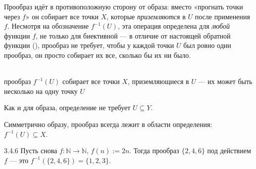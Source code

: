 \begin{intuition}
Прообраз идёт в противоположную сторону от образа: вместо «прогнать точки через $f$» он
собирает все точки $X$, которые \emph{приземляются} в $U$ после применения $f$. Несмотря на
обозначение $f^{-1}(U)$, эта операция определена для \emph{любой} функции $f$, не только для
биективной — в отличие от настоящей обратной функции
(), прообраз не требует, чтобы у каждой точки $U$ был
ровно один прообраз, он просто собирает их все, сколько бы их ни было.

\begin{center}
\\
{\footnotesize\color{intuitiongray}прообраз $f^{-1}(U)$ собирает все точки $X$, приземляющиеся
в $U$ — их может быть несколько на одну точку $U$}
\end{center}
\end{intuition}

\begin{remark}
Как и для образа, определение не требует $U\subseteq Y$.
\end{remark}

\begin{remark}
Симметрично образу, прообраз всегда лежит в области определения: $f^{-1}(U)\subseteq X$.
\end{remark}

\begin{example}{3.4.6}{}
Пусть снова $f:\mathbb{N}\to\mathbb{N}$, $f(n):=2n$. Тогда прообраз $\{2,4,6\}$ под
действием $f$ — это $f^{-1}(\{2,4,6\}) = \{1,2,3\}$.
\end{example}

